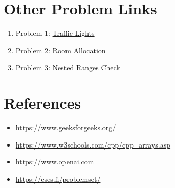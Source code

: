 \documentclass[12pt, a4paper]{report}
\begin{document}
\newpage
\section*{Other Problem Links}

\begin{enumerate}
    \item Problem 1: \href{https://cses.fi/problemset/task/1163}{Traffic Lights}
    \item Problem 2: \href{https://cses.fi/problemset/task/1164}{Room Allocation}
    \item Problem 3: \href{https://cses.fi/problemset/task/2168}{Nested Ranges Check}
\end{enumerate}

\section*{References}

\begin{itemize}
    \item \url{https://www.geeksforgeeks.org/}
    \item \url{https://www.w3schools.com/cpp/cpp_arrays.asp}
    \item \url{https://www.openai.com}
     \item \url{https://cses.fi/problemset/}
\end{itemize}
\end{document}
